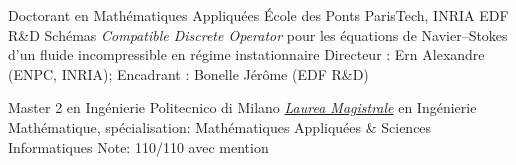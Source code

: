 \documentclass[french]{RMcv}
\begin{document}






%
%


%
        {Doctorant en Math\'ematiques Appliqu\'ees}%
        {\'Ecole des Ponts ParisTech, INRIA EDF R\&D}%
        {Sch\'emas \emph{Compatible Discrete Operator} pour les \'equations de Navier–Stokes d’un fluide incompressible en r\'egime instationnaire}%
        {Directeur : Ern Alexandre (ENPC, INRIA); Encadrant : Bonelle J\'er\^ome (EDF R\&D)}

%
        {Master 2 en Ing\'enierie}%
        {Politecnico di Milano}%
        {\href{https://www.politesi.polimi.it/handle/10589/133692}{\emph{Laurea Magistrale}} en Ing\'enierie Math\'ematique, sp\'ecialisation: Math\'ematiques Appliqu\'ees \& Sciences Informatiques}%
        {Note: 110/110 avec mention}
\end{document}

